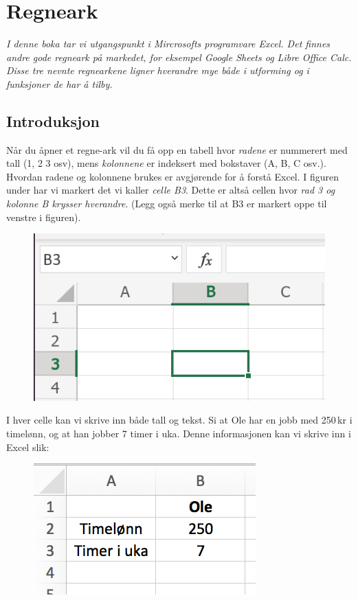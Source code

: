 



\section{Regneark}

\textit{I denne boka tar vi utgangspunkt i Mircrosofts programvare Excel. Det finnes andre gode regneark på markedet, for eksempel Google Sheets og Libre Office Calc. Disse tre nevnte regnearkene ligner hverandre mye både i utforming og i funksjoner de har å tilby.
} 

\subsection{Introduksjon}



Når du åpner et regne-ark vil du få opp en tabell hvor \textit{radene} er nummerert med tall (1, 2 3 osv), mens \textit{kolonnene} er indeksert med bokstaver (A, B, C osv.). Hvordan radene og kolonnene brukes er avgjørende for å forstå Excel. I figuren under har vi markert det vi kaller \textit{celle B\textsl{3}}. Dette er altså cellen hvor \textsl{rad 3 og kolonne B krysser hverandre}. (Legg også merke til at B3 er markert oppe til venstre i figuren).

\begin{figure}[H]
	\centering
	\includegraphics[scale=0.25]{figs/B3}
\end{figure}
I hver celle kan vi skrive inn både tall og tekst. Si at Ole har en jobb med 250\,kr i timelønn, og at han jobber 7 timer i uka. Denne informasjonen kan vi skrive inn i Excel slik:
\begin{figure}[H]
	\centering
	\includegraphics[scale=0.35]{figs/ex2}
\end{figure}
